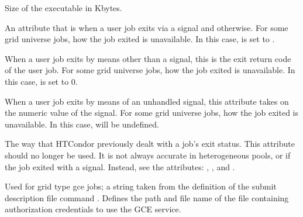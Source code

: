 \begin{description}
\item[\AdAttr{ExecutableSize}:]  Size of the executable in Kbytes.

\item[\AdAttr{ExitBySignal}:]  An attribute that is 
when a user job exits via a signal and  otherwise.
For some grid universe jobs, how the job exited is
unavailable. In this case,  is set to  .

\item[\AdAttr{ExitCode}:]  When a user job exits by means other than a signal,
this is the exit return code of the user job.
For some grid universe jobs, how the job exited is
unavailable. In this case,  is set to  0.

\item[\AdAttr{ExitSignal}:]  When a user job exits by means of an unhandled 
signal, this attribute takes on the numeric value of the signal.
For some grid universe jobs, how the job exited is
unavailable. In this case,  will be undefined.


\item[\AdAttr{ExitStatus}:]  The way that HTCondor previously dealt with
a job's exit status.
This attribute should no longer be used.
It is not always accurate in
heterogeneous pools, or if the job exited with a signal.
Instead, see the attributes: ,
, and
.

\item[\AdAttr{GceAuthFile}:] 
Used for grid type gce jobs;
a string taken from the definition of the submit description file command
.
Defines the path and file name of the file containing authorization
credentials to use the GCE service.


\end{description}

